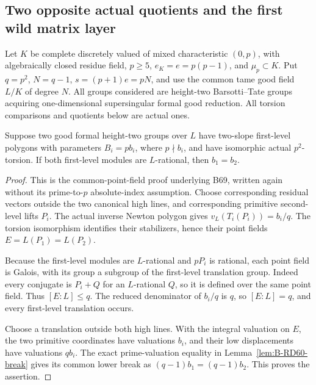 \subsection{Two opposite actual quotients and the first wild matrix layer}

Let \(K\) be complete discretely valued of mixed characteristic
\((0,p)\), with algebraically closed residue field,
\(p\ge5\), \(e_K=e=p(p-1)\), and \(\mu_p\subset K\).
Put \(q=p^2\), \(N=q-1\), \(s=(p+1)e=pN\), and use
the common tame good field \(L/K\) of degree \(N\).
All groups considered are height-two Barsotti--Tate groups
acquiring one-dimensional supersingular formal good reduction.
All torsion comparisons and quotients below are actual ones.

\begin{lemma}
\label{lem:B-RD83-tame}
Suppose two good formal height-two groups over \(L\) have
two-slope first-level polygons with parameters \(B_i=pb_i\),
where \(p\nmid b_i\), and have isomorphic actual
\(p^2\)-torsion. If both first-level modules are
\(L\)-rational, then \(b_1=b_2\).
\end{lemma}
\begin{proof}
This is the common-point-field proof underlying B69, written
again without its prime-to-\(p\) absolute-index assumption.
Choose corresponding residual vectors outside the two
canonical high lines, and corresponding primitive
second-level lifts \(P_i\). The actual inverse Newton
polygon gives \(v_L(T_i(P_i))=b_i/q\). The torsion
isomorphism identifies their stabilizers, hence their
point fields \(E=L(P_1)=L(P_2)\).

Because the first-level modules are \(L\)-rational and
\(pP_i\) is rational, each point field is Galois, with
its group a subgroup of the first-level translation
group. Indeed every conjugate is \(P_i+Q\) for an
\(L\)-rational \(Q\), so it is defined over the same
point field. Thus \([E:L]\le q\). The reduced denominator
of \(b_i/q\) is \(q\), so \([E:L]=q\), and every
first-level translation occurs.

Choose a translation outside both high lines. With the
integral valuation on \(E\), the two primitive coordinates
have valuations \(b_i\), and their low displacements have
valuations \(qb_i\). The exact prime-valuation equality
in Lemma~\ref{lem:B-RD60-break} gives its common lower
break as \((q-1)b_1=(q-1)b_2\). This proves the assertion.
\end{proof}

